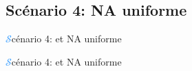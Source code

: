 \subsection{Scénario 4: NA uniforme}
\begin{frame}{{\huge\textcolor{dodgerblue}{$\mathcal{S}$}}cénario 4:  et NA uniforme}
\begin{center}
\end{center}
\end{frame}
\begin{frame}{{\huge\textcolor{dodgerblue}{$\mathcal{S}$}}cénario 4:  et NA uniforme}
\begin{center}
\end{center}
\end{frame}

